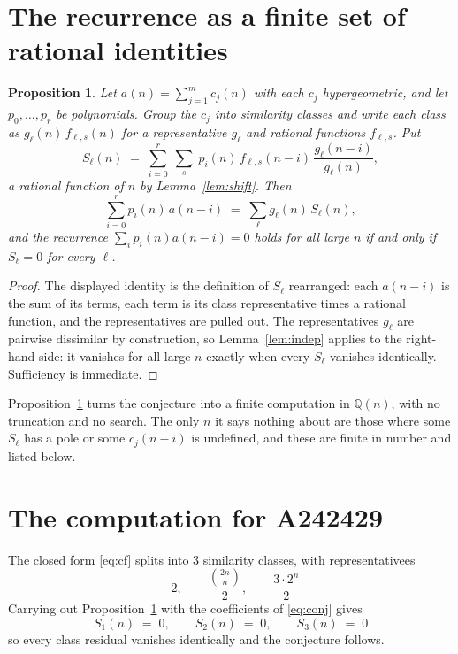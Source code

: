 \documentclass[11pt,a4paper]{article}
\theoremstyle{plain}
\newtheorem{proposition}[theorem]{Proposition}
\theoremstyle{definition}
\begin{document}
\section{The recurrence as a finite set of rational identities}

\begin{proposition}\label{prop:main}
Let $a(n)=\sum_{j=1}^{m}c_{j}(n)$ with each $c_{j}$ hypergeometric, and let
$p_{0},\dots,p_{r}$ be polynomials. Group the $c_{j}$ into similarity classes and write
each class as $g_{\ell}(n)\,f_{\ell,s}(n)$ for a representative $g_{\ell}$ and rational
functions $f_{\ell,s}$. Put
\[
S_{\ell}(n)\;=\;\sum_{i=0}^{r}\;\sum_{s}\;p_{i}(n)\,f_{\ell,s}(n-i)\,
\frac{g_{\ell}(n-i)}{g_{\ell}(n)} ,
\]
a rational function of $n$ by Lemma~\ref{lem:shift}. Then
\[
\sum_{i=0}^{r}p_{i}(n)\,a(n-i)\;=\;\sum_{\ell}g_{\ell}(n)\,S_{\ell}(n),
\]
and the recurrence $\sum_{i}p_{i}(n)a(n-i)=0$ holds for all large $n$ if and only if
$S_{\ell}=0$ for every $\ell$.
\end{proposition}

\begin{proof}
The displayed identity is the definition of $S_{\ell}$ rearranged: each $a(n-i)$ is the
sum of its terms, each term is its class representative times a rational function, and the
representatives are pulled out. The representatives $g_{\ell}$ are pairwise dissimilar by
construction, so Lemma~\ref{lem:indep} applies to the right-hand side: it vanishes for all
large $n$ exactly when every $S_{\ell}$ vanishes identically. Sufficiency is immediate.
\end{proof}

Proposition~\ref{prop:main} turns the conjecture into a finite computation in
$\mathbb{Q}(n)$, with no truncation and no search. The only $n$ it says nothing about are
those where some $S_{\ell}$ has a pole or some $c_{j}(n-i)$ is undefined, and these are
finite in number and listed below.

\section{The computation for A242429}

The closed form \eqref{eq:cf} splits into 3 similarity classes, with
representativees
\[
-2,\qquad \frac{{\binom{2 n}{n}}}{2},\qquad \frac{3 \cdot 2^{n}}{2}
\]
Carrying out Proposition~\ref{prop:main} with the coefficients of \eqref{eq:conj} gives
\[
S_{1}(n)\;=\;0,\qquad S_{2}(n)\;=\;0,\qquad S_{3}(n)\;=\;0
\]
so every class residual vanishes identically and the conjecture follows.
\end{document}
